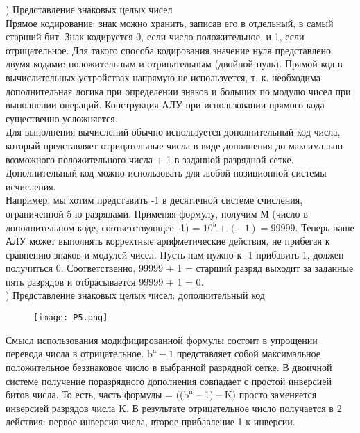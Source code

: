 ) Представление знаковых целых чисел \\
Прямое кодирование: знак можно хранить, записав его в отдельный, в самый старший бит. Знак кодируется 0, если число положительное, и 1, если отрицательное. Для такого способа кодирования значение нуля представлено двумя кодами: положительным и отрицательным (двойной нуль). Прямой код в вычислительных устройствах напрямую не используется, т. к. необходима дополнительная логика при определении знаков и больших по модулю чисел при выполнении операций. Конструкция АЛУ при использовании прямого кода существенно усложняется. \\
Для выполнения вычислений обычно используется дополнительный код числа, который представляет отрицательные числа в виде дополнения до максимально возможного положительного числа + 1 в заданной разрядной сетке. Дополнительный код можно использовать для любой позиционной системы исчисления.  \\
Например, мы хотим представить -1 в десятичной системе счисления, ограниченной 5-ю разрядами. Применяя формулу, получим М (число в дополнительном коде, соответствующее -1) = $10^5 + (-1) = 99999$. Теперь наше АЛУ может выполнять корректные арифметические действия, не прибегая к сравнению знаков и модулей чисел. Пусть нам нужно к -1 прибавить 1, должен получиться 0. Соответственно, 99999 + 1 = старший разряд выходит за заданные пять разрядов и отбрасывается 99999 + 1 = 0. \\
\newpage
{}) Представление знаковых целых чисел: дополнительный код \\
\begin{figure}[H]
    \centering
    \texttt{[image: P5.png]}
\end{figure}
\noindent Смысл использования модифицированной формулы состоит в упрощении перевода числа в отрицательное. $\text{b}^{\text{n}}-1$ представляет собой максимальное положительное беззнаковое число в выбранной разрядной сетке. В двоичной системе получение поразрядного дополнения совпадает с простой инверсией битов числа. То есть, часть формулы = (($\text{b}^{\text{n}}$ – 1) – K) просто заменяется инверсией разрядов числа K. В результате отрицательное число получается в 2 действия: первое инверсия числа, второе прибавление 1 к инверсии. \\ 

